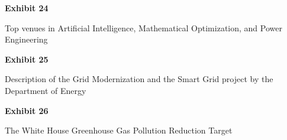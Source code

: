 \documentclass{article}
\begin{document}
% 



\vspace*{\fill}
\begin{center}
{\LARGE \bf
Exhibit 24
}

\vspace{10\baselineskip}

{\large Top venues in Artificial Intelligence, Mathematical Optimization, and Power Engineering}

\end{center}
\vspace*{\fill}


% 

% 

% 

% 



\vspace*{\fill}
\begin{center}
{\LARGE \bf
Exhibit 25
}

\vspace{10\baselineskip}

{\large Description of the Grid Modernization and the Smart Grid project by the Department of Energy}

\end{center}
\vspace*{\fill}






\vspace*{\fill}
\begin{center}
{\LARGE \bf
Exhibit 26
}

\vspace{10\baselineskip}

{\large The White House Greenhouse Gas Pollution Reduction Target}

\end{center}
\vspace*{\fill}
\end{document}
